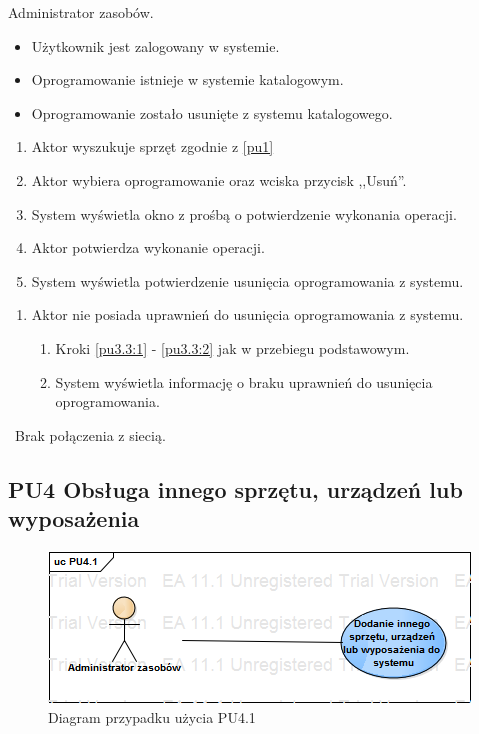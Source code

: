 Administrator zasobów.

\begin{itemize}
\item Użytkownik jest zalogowany w systemie.
\item Oprogramowanie istnieje w systemie katalogowym.
\end{itemize}

\begin{itemize}
\item Oprogramowanie zostało usunięte z systemu katalogowego.
\end{itemize}

\begin{enumerate}
\item \label{pu3.3:1} Aktor wyszukuje sprzęt zgodnie z \ref{pu1}
\item \label{pu3.3:2} Aktor wybiera oprogramowanie oraz wciska przycisk ,,Usuń''.
\item System wyświetla okno z prośbą o potwierdzenie wykonania operacji.
\item Aktor potwierdza wykonanie operacji.
\item System wyświetla potwierdzenie usunięcia oprogramowania z systemu.
\end{enumerate}

\begin{enumerate}
\item Aktor nie posiada uprawnień do usunięcia oprogramowania z systemu.
	\begin{enumerate}[label*=\arabic*.]
		\item Kroki \ref{pu3.3:1} - \ref{pu3.3:2} jak w przebiegu podstawowym.
		\item System wyświetla informację o braku uprawnień do usunięcia oprogramowania.
	\end{enumerate}
\end{enumerate}

\
Brak połączenia z siecią.

\subsection{PU4 Obsługa innego sprzętu, urządzeń lub wyposażenia} \label{pu4}

\begin{figure}[h!]
	\centering
	\includegraphics[scale=0.6]{img/diagrams/useCaseDiagrams/PU4_1.png}
	\caption{Diagram przypadku użycia PU4.1 \label{fig:labelUCPU2.1}}
\end{figure}

